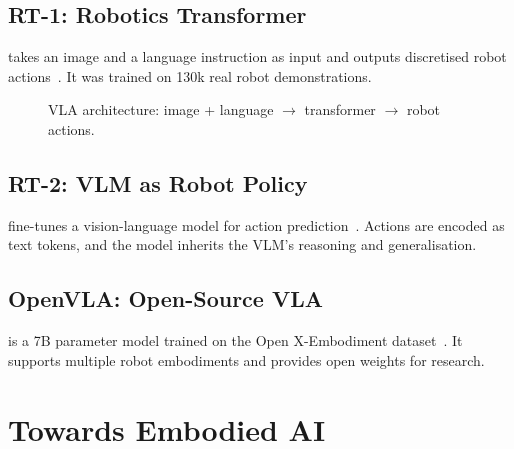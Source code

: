 
\subsection{RT-1: Robotics Transformer}

 takes an image and a language instruction as input and outputs discretised robot actions~\cite{Brohan2022RT1}. It was trained on 130k real robot demonstrations.

\begin{figure}
\centering
{}
\caption{VLA architecture: image + language $\to$ transformer $\to$ robot actions.}
\label{fig:vla}
\end{figure}

\subsection{RT-2: VLM as Robot Policy}

 fine-tunes a vision-language model for action prediction~\cite{Brohan2023RT2}. Actions are encoded as text tokens, and the model inherits the VLM's reasoning and generalisation.

\subsection{OpenVLA: Open-Source VLA}

 is a 7B parameter model trained on the Open X-Embodiment dataset~\cite{Kim2024OpenVLA}. It supports multiple robot embodiments and provides open weights for research.


\section{Towards Embodied AI}

